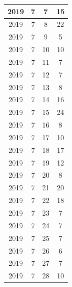 \begin{longtable} {|c|c|c|c|}
\hline
2019         & 7            & 7            & 15                        \\ 
\hline
2019         & 7            & 8            & 22                        \\ 
\hline
2019         & 7            & 9            & 5                         \\ 
\hline
2019         & 7            & 10           & 10                        \\ 
\hline
2019         & 7            & 11           & 7                         \\ 
\hline
2019         & 7            & 12           & 7                         \\ 
\hline
2019         & 7            & 13           & 8                         \\ 
\hline
2019         & 7            & 14           & 16                        \\ 
\hline
2019         & 7            & 15           & 24                        \\ 
\hline
2019         & 7            & 16           & 8                         \\ 
\hline
2019         & 7            & 17           & 10                        \\ 
\hline
2019         & 7            & 18           & 17                        \\ 
\hline
2019         & 7            & 19           & 12                        \\ 
\hline
2019         & 7            & 20           & 8                         \\ 
\hline
2019         & 7            & 21           & 20                        \\ 
\hline
2019         & 7            & 22           & 18                        \\ 
\hline
2019         & 7            & 23           & 7                         \\ 
\hline
2019         & 7            & 24           & 7                         \\ 
\hline
2019         & 7            & 25           & 7                         \\ 
\hline
2019         & 7            & 26           & 6                         \\ 
\hline
2019         & 7            & 27           & 7                         \\ 
\hline
2019         & 7            & 28           & 10                        \\ 

\end{longtable}

